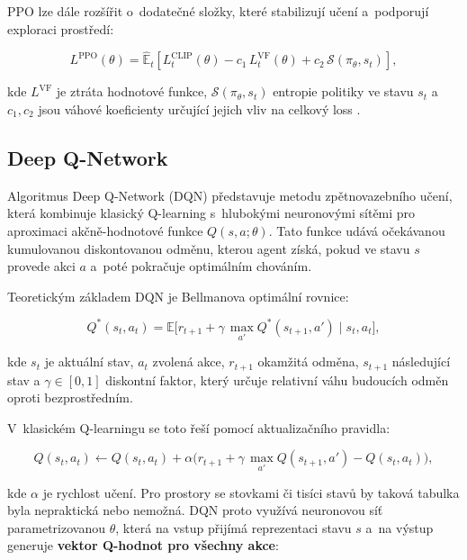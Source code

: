 PPO lze dále rozšířit o~dodatečné složky, které stabilizují učení a~podporují exploraci prostředí:

\begin{equation}
L^{\text{PPO}}(\theta) =
\hat{\mathbb{E}}_t\left[L^{\text{CLIP}}_t(\theta)-c_1\,L^{\text{VF}}_t(\theta)+c_2\,\mathcal{S}(\pi_\theta,s_t)\right],
\end{equation}

kde $L^{\text{VF}}$ je ztráta hodnotové funkce, $\mathcal{S}(\pi_\theta,s_t)$ entropie politiky ve
stavu $s_t$ a $c_1,c_2$ jsou váhové koeficienty určující jejich vliv na celkový loss \cite{Schulman2017}.

\newpage

\subsection{Deep Q-Network}

Algoritmus Deep Q-Network (DQN)\cite{Sutton2018}\cite{Mnih2013}\cite{Jochec2024}\cite{Mnih2015} představuje metodu zpětnovazebního učení, která kombinuje klasický Q-learning\cite{QLearning} s~hlubokými neuronovými sítěmi pro aproximaci akčně-hodnotové funkce \(Q(s,a;\theta)\). Tato funkce udává očekávanou kumulovanou diskontovanou odměnu, kterou agent získá, pokud ve stavu \(s\) provede akci \(a\) a~poté pokračuje optimálním chováním.

Teoretickým základem DQN je Bellmanova optimální rovnice:

\begin{equation}
Q^*(s_t,a_t)=\mathbb{E}\Big[r_{t+1}+\gamma\,\max_{a'}Q^*(s_{t+1},a')\;\Big|\;s_t,a_t\Big],
\end{equation}

kde \(s_t\) je aktuální stav, \(a_t\) zvolená akce, \(r_{t+1}\) okamžitá odměna, \(s_{t+1}\) následující stav a \(\gamma\in[0,1]\) diskontní faktor, který určuje relativní váhu budoucích odměn oproti bezprostředním.

V~klasickém Q-learningu se toto řeší pomocí aktualizačního pravidla:

\begin{equation}
Q(s_t,a_t)\leftarrow Q(s_t,a_t)+\alpha\Big(r_{t+1}+\gamma\,\max_{a'}Q(s_{t+1},a')-Q(s_t,a_t)\Big),
\end{equation}

kde \(\alpha\) je rychlost učení. Pro prostory se stovkami či tisíci stavů by taková tabulka byla nepraktická nebo nemožná. DQN proto využívá neuronovou síť parametrizovanou \(\theta\), která na vstup přijímá reprezentaci stavu \(s\) a~na výstup generuje \textbf{vektor Q-hodnot pro všechny akce}:


